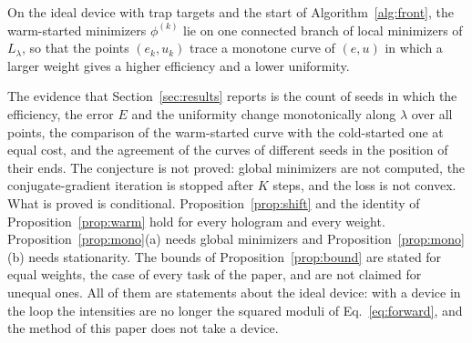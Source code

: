 \begin{conjecture}\label{conj:branch}
On the ideal device with trap targets and the start of Algorithm~\ref{alg:front}, the warm-started minimizers $\phi^{(k)}$ lie on one connected branch of local minimizers of $L_\lambda$, so that the points $(e_k,u_k)$ trace a monotone curve of $(e,u)$ in which a larger weight gives a higher efficiency and a lower uniformity.
\end{conjecture}
The evidence that Section~\ref{sec:results} reports is the count of seeds in which the efficiency, the error $E$ and the uniformity change monotonically along $\lambda$ over all \nLambda{} points, the comparison of the warm-started curve with the cold-started one at equal cost, and the agreement of the curves of different seeds in the position of their ends.
The conjecture is not proved: global minimizers are not computed, the conjugate-gradient iteration is stopped after $K$ steps, and the loss is not convex. What is proved is conditional. Proposition~\ref{prop:shift} and the identity of Proposition~\ref{prop:warm} hold for every hologram and every weight. Proposition~\ref{prop:mono}(a) needs global minimizers
and Proposition~\ref{prop:mono}(b) needs stationarity. The bounds of Proposition~\ref{prop:bound} are stated for equal weights, the case of every task of the paper, and are not claimed for unequal ones.
All of them are statements about the ideal device: with a device in the loop the intensities are no longer the squared moduli of Eq.~\ref{eq:forward}, and the method of this paper does not take a device.
